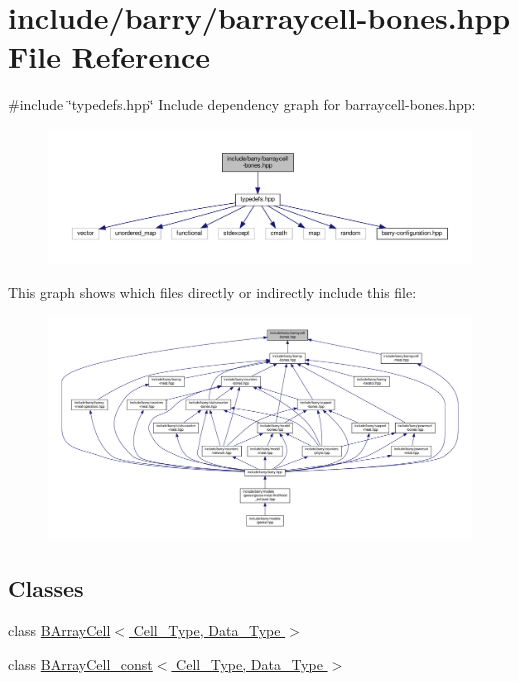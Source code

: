 \hypertarget{barraycell-bones_8hpp}{}\section{include/barry/barraycell-\/bones.hpp File Reference}
\label{barraycell-bones_8hpp}
{\ttfamily \#include \char`\"{}typedefs.\+hpp\char`\"{}}\newline
Include dependency graph for barraycell-\/bones.hpp\+:\nopagebreak
\begin{figure}[H]
\begin{center}
\leavevmode
\includegraphics[width=350pt]{barraycell-bones_8hpp__incl}
\end{center}
\end{figure}
This graph shows which files directly or indirectly include this file\+:
\nopagebreak
\begin{figure}[H]
\begin{center}
\leavevmode
\includegraphics[width=350pt]{barraycell-bones_8hpp__dep__incl}
\end{center}
\end{figure}
\subsection*{Classes}
\begin{DoxyCompactItemize}
\item 
class \hyperlink{class_b_array_cell}{B\+Array\+Cell$<$ Cell\+\_\+\+Type, Data\+\_\+\+Type $>$}
\item 
class \hyperlink{class_b_array_cell__const}{B\+Array\+Cell\+\_\+const$<$ Cell\+\_\+\+Type, Data\+\_\+\+Type $>$}
\end{DoxyCompactItemize}
